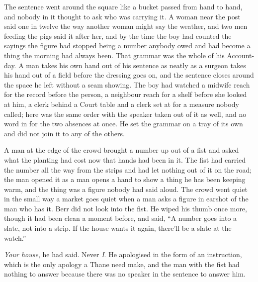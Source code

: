 The sentence went around the square like a bucket passed from hand to hand, and nobody in it thought to ask who was carrying it. A woman near the post said one in twelve the way another woman might say the weather, and two men feeding the pigs said it after her, and by the time the boy had counted the sayings the figure had stopped being a number anybody owed and had become a thing the morning had always been. That grammar was the whole of his Account-day. A man takes his own hand out of his sentence as neatly as a surgeon takes his hand out of a field before the dressing goes on, and the sentence closes around the space he left without a seam showing. The boy had watched a midwife reach for the record before the person, a neighbour reach for a shelf before she looked at him, a clerk behind a Court table and a clerk set at  for a measure nobody called; here was the same order with the speaker taken out of it as well, and no word in  for the two absences at once. He set the grammar on a tray of its own and did not join it to any of the others.

\scenebreak

A man at the edge of the crowd brought a number up out of a fist and asked what the planting had cost now that hands had been in it. The fist had carried the number all the way from the strips and had let nothing out of it on the road; the man opened it as a man opens a hand to show a thing he has been keeping warm, and the thing was a figure nobody had said aloud. The crowd went quiet in the small way a market goes quiet when a man asks a figure in earshot of the man who has it. Berr did not look into the fist. He wiped his thumb once more, though it had been clean a moment before, and said, “A number goes into a slate, not into a strip. If the house wants it again, there'll be a slate at the watch.”

\emph{Your house}, he had said. Never \emph{I}. He apologised in the form of an instruction, which is the only apology a Thane need make, and the man with the fist had nothing to answer because there was no speaker in the sentence to answer him.

